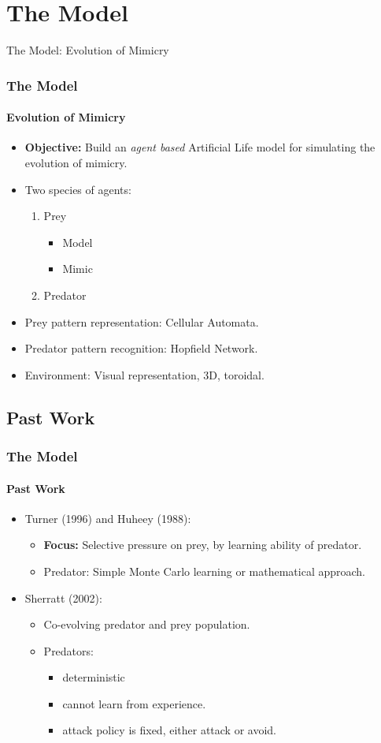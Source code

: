 \section{The Model}

\frame
{
	\begin{center}
		\LARGE The Model: Evolution of Mimicry
	\end{center}
}

\frame
{
	\frametitle{The Model}
	\framesubtitle{Evolution of Mimicry}
	
	\begin{itemize}
		\item \textbf{Objective:} Build an \textit{agent based} Artificial Life model for simulating the evolution of mimicry.	
		\item Two species of agents:
			\begin{enumerate}
				\item Prey
					\begin{itemize}
						\item Model
						\item Mimic
					\end{itemize}
				\item Predator
			\end{enumerate}
		\item Prey pattern representation: Cellular Automata.
		\item Predator pattern recognition: Hopfield Network.
		\item Environment: Visual representation, 3D, toroidal.
	\end{itemize}	
}

\subsection{Past Work}

\frame
{
	\frametitle{The Model}
	\framesubtitle{Past Work}

	\begin{itemize}
		\item Turner (1996) and Huheey (1988):
			\begin{itemize}
				\item \textbf{Focus:} Selective pressure on prey, by learning ability of predator.
				\item Predator: Simple Monte Carlo learning or mathematical approach.
			\end{itemize}
		\item Sherratt (2002):
			\begin{itemize}
				\item Co-evolving predator and prey population.
				\item Predators:
				\begin{itemize}
					\item deterministic
					\item cannot learn from experience.
					\item attack policy is fixed, either attack or avoid.
				\end{itemize}
			\end{itemize}
	\end{itemize}
}

